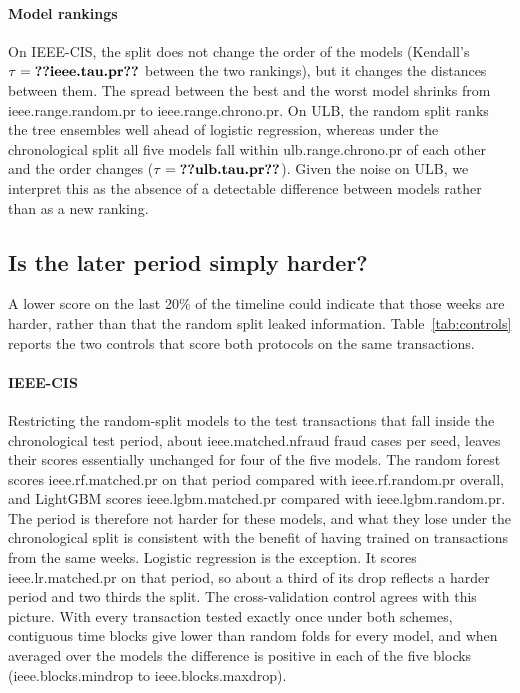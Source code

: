 \paragraph{Model rankings}
On IEEE-CIS, the split does not change the order of the models (Kendall's $\tau=\num{ieee.tau.pr}$ between the two \prauc{} rankings), but it changes the distances between them. The spread between the best and the worst model shrinks from \num{ieee.range.random.pr} to \num{ieee.range.chrono.pr}. On ULB, the random split ranks the tree ensembles well ahead of logistic regression, whereas under the chronological split all five models fall within \num{ulb.range.chrono.pr} of each other and the order changes ($\tau=\num{ulb.tau.pr}$). Given the noise on ULB, we interpret this as the absence of a detectable difference between models rather than as a new ranking.

\subsection{Is the later period simply harder?}
\label{sec:controls}

A lower score on the last 20\% of the timeline could indicate that those weeks are harder, rather than that the random split leaked information. Table~\ref{tab:controls} reports the two controls that score both protocols on the same transactions.



\paragraph{IEEE-CIS}
Restricting the random-split models to the test transactions that fall inside the chronological test period, about \num{ieee.matched.nfraud} fraud cases per seed, leaves their scores essentially unchanged for four of the five models. The random forest scores \num{ieee.rf.matched.pr} on that period compared with \num{ieee.rf.random.pr} overall, and LightGBM scores \num{ieee.lgbm.matched.pr} compared with \num{ieee.lgbm.random.pr}. The period is therefore not harder for these models, and what they lose under the chronological split is consistent with the benefit of having trained on transactions from the same weeks. Logistic regression is the exception. It scores \num{ieee.lr.matched.pr} on that period, so about a third of its drop reflects a harder period and two thirds the split. The cross-validation control agrees with this picture. With every transaction tested exactly once under both schemes, contiguous time blocks give lower \prauc{} than random folds for every model, and when averaged over the models the difference is positive in each of the five blocks (\num{ieee.blocks.mindrop} to \num{ieee.blocks.maxdrop}).

